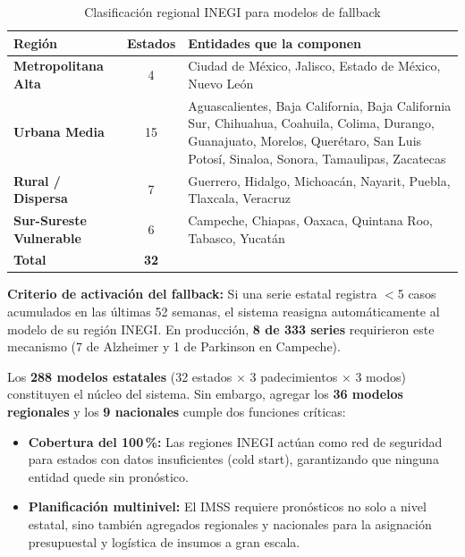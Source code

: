 \documentclass[12pt, letterpaper]{article}
\begin{document}
\begin{table}[H]
\centering
\caption{Clasificación regional INEGI para modelos de fallback}
\label{tab:regiones_inegi}
\small
\setlength{\tabcolsep}{4pt}
\begin{tabularx}{\textwidth}{>{\bfseries}l c X}
\toprule
\textbf{Región} & \textbf{Estados} & \textbf{Entidades que la componen} \\
\midrule
\rowcolor{lightgreen!15}
Metropolitana Alta & 4 & Ciudad de México, Jalisco, Estado de México, Nuevo León \\
\addlinespace
Urbana Media & 15 & Aguascalientes, Baja California, Baja California Sur, Chihuahua, Coahuila, Colima, Durango, Guanajuato, Morelos, Querétaro, San Luis Potosí, Sinaloa, Sonora, Tamaulipas, Zacatecas \\
\addlinespace
\rowcolor{lightgreen!15}
Rural / Dispersa & 7 & Guerrero, Hidalgo, Michoacán, Nayarit, Puebla, Tlaxcala, Veracruz \\
\addlinespace
Sur-Sureste Vulnerable & 6 & Campeche, Chiapas, Oaxaca, Quintana Roo, Tabasco, Yucatán \\
\midrule
\textbf{Total} & \textbf{32} & \\
\bottomrule
\end{tabularx}
\vspace{0.2cm}

{\scriptsize \textbf{Criterio de activación del fallback:} Si una serie estatal registra $<$5 casos acumulados en las últimas 52 semanas, el sistema reasigna automáticamente al modelo de su región INEGI. En producción, \textbf{8 de 333 series} requirieron este mecanismo (7 de Alzheimer y 1 de Parkinson en Campeche).}
\end{table}

\begin{insightbox}
Los \textbf{288 modelos estatales} (32 estados $\times$ 3 padecimientos $\times$ 3 modos) constituyen el núcleo del sistema. Sin embargo, agregar los \textbf{36 modelos regionales} y los \textbf{9 nacionales} cumple dos funciones críticas:
\begin{itemize}[noitemsep]
    \item \textbf{Cobertura del 100\,\%:} Las regiones INEGI actúan como red de seguridad para estados con datos insuficientes (cold start), garantizando que ninguna entidad quede sin pronóstico.
    \item \textbf{Planificación multinivel:} El IMSS requiere pronósticos no solo a nivel estatal, sino también agregados regionales y nacionales para la asignación presupuestal y logística de insumos a gran escala.
\end{itemize}
\end{insightbox}
\end{document}
